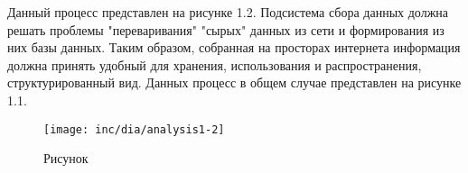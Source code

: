 Данный процесс представлен на рисунке 1.2.
Подсистема сбора данных должна решать проблемы "переваривания" "сырых" данных из сети и формирования из них базы данных. Таким образом, собранная на просторах интернета информация должна принять удобный для хранения, использования и распространения, структурированный вид. Данных процесс в общем случае представлен на рисунке 1.1.
\begin{figure}
  \centering
  \texttt{[image: inc/dia/analysis1-2]}
  \caption{Рисунок}
  \label{fig:fig02}
\end{figure}
